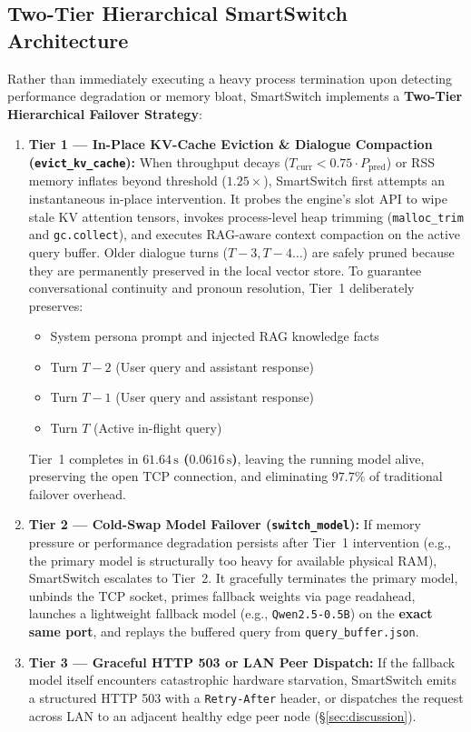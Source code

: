 \documentclass[11pt,a4paper]{article}
\newcommand{\Ppred}{P_{\mathrm{pred}}}
\newcommand{\su}{\,\mathrm{s}}
\newcommand{\code}[1]{\texttt{#1}}
\begin{document}
\subsection{Two-Tier Hierarchical SmartSwitch Architecture}\label{sec:hierarchical_smartswitch}
Rather than immediately executing a heavy process termination upon detecting performance degradation or memory bloat, SmartSwitch implements a \textbf{Two-Tier Hierarchical Failover Strategy}:
\begin{enumerate}[leftmargin=*]
  \item \textbf{Tier 1 --- In-Place KV-Cache Eviction \& Dialogue Compaction (\code{evict\_kv\_cache}):}
  When throughput decays ($T_{\mathrm{curr}} < 0.75 \cdot \Ppred$) or RSS memory inflates beyond threshold ($1.25\times$), SmartSwitch first attempts an instantaneous in-place intervention. It probes the engine's slot API to wipe stale KV attention tensors, invokes process-level heap trimming (\code{malloc\_trim} and \code{gc.collect}), and executes RAG-aware context compaction on the active query buffer. Older dialogue turns ($T-3, T-4 \dots$) are safely pruned because they are permanently preserved in the local vector store. To guarantee conversational continuity and pronoun resolution, Tier~1 deliberately preserves:
  \begin{itemize}[leftmargin=1.5em]
    \item System persona prompt and injected RAG knowledge facts
    \item Turn $T-2$ (User query and assistant response)
    \item Turn $T-1$ (User query and assistant response)
    \item Turn $T$ (Active in-flight query)
  \end{itemize}
  Tier~1 completes in \textbf{$61.64\su$ ($0.0616\su$)}, leaving the running model alive, preserving the open TCP connection, and eliminating $97.7\%$ of traditional failover overhead.
  
  \item \textbf{Tier 2 --- Cold-Swap Model Failover (\code{switch\_model}):}
  If memory pressure or performance degradation persists after Tier~1 intervention (e.g., the primary model is structurally too heavy for available physical RAM), SmartSwitch escalates to Tier~2. It gracefully terminates the primary model, unbinds the TCP socket, primes fallback weights via page readahead, launches a lightweight fallback model (e.g., \code{Qwen2.5-0.5B}) on the \textbf{exact same port}, and replays the buffered query from \code{query\_buffer.json}.
  
  \item \textbf{Tier 3 --- Graceful HTTP 503 or LAN Peer Dispatch:}
  If the fallback model itself encounters catastrophic hardware starvation, SmartSwitch emits a structured HTTP 503 with a \code{Retry-After} header, or dispatches the request across LAN to an adjacent healthy edge peer node (\S\ref{sec:discussion}).
\end{enumerate}
\end{document}
